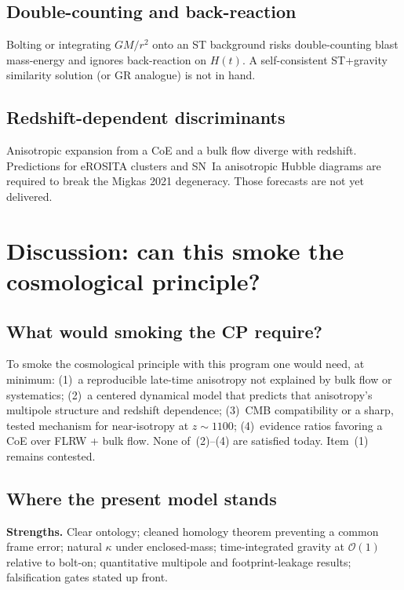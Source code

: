 \documentclass[11pt,a4paper]{article}
\begin{document}
\subsection{Double-counting and back-reaction}

Bolting or integrating \(GM/r^2\) onto an ST background risks double-counting blast mass-energy and ignores back-reaction on \(H(t)\). A self-consistent ST+gravity similarity solution (or GR analogue) is not in hand.

\subsection{Redshift-dependent discriminants}

Anisotropic expansion from a CoE and a bulk flow diverge with redshift. Predictions for eROSITA clusters and SN~Ia anisotropic Hubble diagrams are required to break the Migkas 2021 degeneracy. Those forecasts are not yet delivered.

\section{Discussion: can this smoke the cosmological principle?}

\subsection{What would smoking the CP require?}

To smoke the cosmological principle with this program one would need, at minimum: (1)~a reproducible late-time anisotropy not explained by bulk flow or systematics; (2)~a centered dynamical model that predicts that anisotropy's multipole structure and redshift dependence; (3)~CMB compatibility or a sharp, tested mechanism for near-isotropy at \(z\sim 1100\); (4)~evidence ratios favoring a CoE over FLRW + bulk flow. None of~(2)--(4) are satisfied today. Item~(1) remains contested.

\subsection{Where the present model stands}

\textbf{Strengths.} Clear ontology; cleaned homology theorem preventing a common frame error; natural \(\kappa\) under enclosed-mass; time-integrated gravity at \(\mathcal{O}(1)\) relative to bolt-on; quantitative multipole and footprint-leakage results; falsification gates stated up front.
\end{document}
